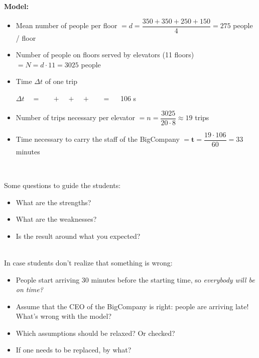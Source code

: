 \textbf{Model:}
\begin{itemize}
	\item Mean number of people per floor $= d = \dfrac{350+350+250+150}{4} = 275$ people / floor
	\item Number of people on floors served by elevators (11 floors) $= N = d \cdot 11 = 3025$ people
	\item Time $\Delta t$ of one trip

\hfil $\Delta t \quad = \quad $  
		$ \;+ \;$ 
		$ \;+\; $ 
		$\;+\; $  $\quad = \quad$ 106 s
		
		\item Number of trips necessary per elevator $= n = \dfrac{3025}{20 \cdot 8} \approx 19$ trips

		\item Time necessary to carry the staff of the BigCompany $= \pmb{t} = \dfrac{19 \cdot 106}{60} = 33 $ minutes
\end{itemize}

\hfill \\

\begin{annotation}
	\begin{notes}

Some questions to guide the students:
	\begin{itemize}
	\item What are the strengths?
	\item What are the weaknesses?
	\item Is the result around what you expected?
\end{itemize}	
	
\hfill \\
In case students don't realize that something is wrong:
\begin{itemize}
	\item People start arriving 30 minutes before the starting time, so \emph{everybody will be on time?}
	\item Assume that the CEO of the BigCompany is right: people are arriving late! What's wrong with the model?

	\item Which assumptions should be relaxed? Or checked?
	\item If one needs to be replaced, by what?
	\end{itemize}
	
	\end{notes}
\end{annotation}

